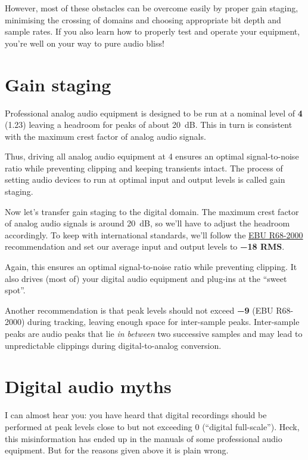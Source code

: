 However, most of these obstacles can be overcome easily by proper gain
staging, minimising the crossing of domains and choosing appropriate
bit depth and sample rates.  If you also learn how to properly test
and operate your equipment, you're well on your way to pure audio
bliss!

\section{Gain staging}
\label{sec:gain_staging}

Professional analog audio equipment is designed to be run at a nominal
level of \textbf{\SI[addsign=all]{+4}{\dBu}} (\SI{1.23}{\VRMS})
leaving a headroom for peaks of about \SI{20}{\dB}.  This in turn is
consistent with the maximum crest factor of analog audio signals.

Thus, driving all analog audio equipment at \SI[addsign=all]{+4}{\dBu}
ensures an optimal signal-to-noise ratio while preventing clipping and
keeping transients intact.  The process of setting audio devices to
run at optimal input and output levels is called gain staging.

Now let's transfer gain staging to the digital domain.  The maximum
crest factor of analog audio signals is around \SI{20}{\dB}, so we'll
have to adjust the headroom accordingly.  To keep with international
standards, we'll follow the
\href{http://tech.ebu.ch/publications/r068}{EBU R68-2000}
recommendation and set our average input and output levels to
\textbf{\SI{-18}{\dBFS} RMS}.

Again, this ensures an optimal signal-to-noise ratio while preventing
clipping.  It also drives (most of) your digital audio equipment and
plug-ins at the ``sweet spot''.

Another recommendation is that peak levels should not exceed
\textbf{\SI{-9}{\dBFS}} (EBU R68-2000) during tracking, leaving enough
space for inter-sample peaks.  Inter-sample peaks are audio peaks that
lie \emph{in between} two successive samples and may lead to
unpredictable clippings during digital-to-analog conversion.

\section{Digital audio myths}
\label{sec:digital_audio_myths}

I can almost hear you: you have heard that digital recordings should
be performed at peak levels close to but not exceeding \SI{0}{\dBFS}
(``digital full-scale'').  Heck, this misinformation has ended up in
the manuals of some professional audio equipment.  But for the reasons
given above it is plain wrong.

